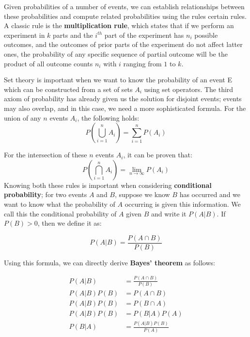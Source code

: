 Given probabilities of a number of events, we can establish
relationships between these probabilities and compute related
probabilities using the rules certain rules. A classic rule is the
\textbf{multiplication rule}, which states that if we perform an
experiment in $k$ parts and the $i^{th}$ part of the experiment has
$n_i$ possible outcomes, and the outcomes of prior parts of the
experiment do not affect latter ones, the probability of any specific
sequence of partial outcome will be the product of all outcome counts
$n_i$ with $i$ ranging from $1$ to $k$.

Set theory is important when we want to know the probability of an
event E which can be constructed from a set of sets $A_i$ using set
operators. The third axiom of probability has already given us the
solution for disjoint events; events may also overlap, and in this
case, we need a more sophisticated formula. For the union of any $n$
events $A_i$, the following holds:
\begin{equation}
P(\bigcup_{i=1}^n A_i) = \sum\limits_{i=1}^n P(A_i)
\end{equation}

For the intersection of these $n$ events $A_i$, it can be proven that:
\begin{equation}
P(\bigcap_{i=1}^n A_i) = \lim_{n \to \infty} P(A_i)
\end{equation}
Knowing both these rules is important when considering
\textbf{conditional probability}; for two events $A$ and $B$, suppose
we know $B$ has occurred and we want to know what the probability of
$A$ occurring is given this information. We call this the conditional
probability of $A$ given $B$ and write it $P(A|B)$. If $P(B) > 0$,
then we define it as:

\begin{equation}
  P(A|B) = \frac{P(A \cap B)}{P(B)}
\end{equation}

Using this formula, we can directly derive \textbf{Bayes' theorem} as follows:

\begin{equation}
\begin{aligned}
  P(A|B) &= \frac{P(A \cap B)}{P(B)} \\
  P(A|B) P(B) &= P(A \cap B)\\
  P(A|B) P(B) &= P(B \cap A)\\
  P(A|B) P(B) &= P(B|A) P(A)\\
  P(B|A) &= \frac{P(A|B) P(B)}{P(A)}
\end{aligned}
\end{equation}

